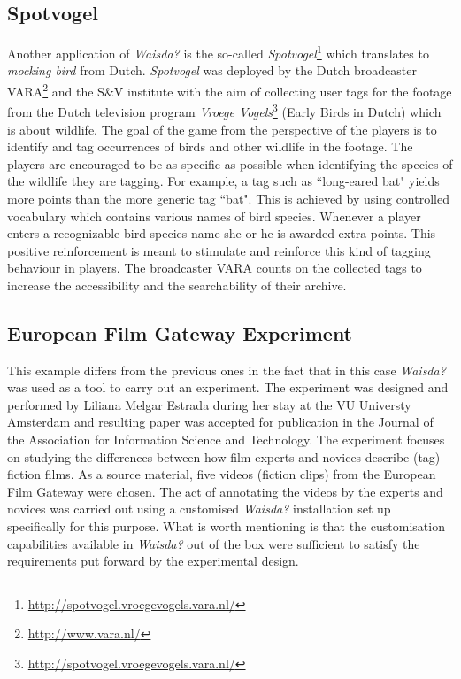 \subsection{Spotvogel}
Another application of \textit{Waisda?} is the so-called \textit{Spotvogel}\footnote{\url{http://spotvogel.vroegevogels.vara.nl/}} which translates to \textit{mocking bird} from Dutch. \textit{Spotvogel} was deployed by the Dutch broadcaster VARA\footnote{\url{http://www.vara.nl/}} and the S\&V institute with the aim of collecting user tags for the footage from the Dutch television program \textit{Vroege Vogels}\footnote{\url{http://spotvogel.vroegevogels.vara.nl/}} (Early Birds in Dutch) which is about wildlife. The goal of the game from the perspective of the players is to identify and tag occurrences of birds and other wildlife in the footage. The players are encouraged to be as specific as possible when identifying the species of the wildlife they are tagging. For example, a tag such as ``long-eared bat" yields more points than the more generic tag ``bat". This is achieved by using controlled vocabulary which contains various names of bird species. Whenever a player enters a recognizable bird species name she or he is awarded extra points. This positive reinforcement is meant to stimulate and reinforce this kind of tagging behaviour in players. The broadcaster VARA counts on the collected tags to increase the accessibility and the searchability of their archive. 

\subsection{European Film Gateway Experiment}
This example differs from the previous ones in the fact that in this case \textit{Waisda?} was used as a tool to carry out an experiment. The experiment was designed and performed by Liliana Melgar Estrada during her stay at the VU Universty Amsterdam and resulting paper \cite{liliana} was accepted for publication in the Journal of the Association for Information Science and Technology. The experiment focuses on studying the differences between how film experts and novices describe (tag) fiction films. As a source material, five videos (fiction clips) from the European Film Gateway were chosen. The act of annotating the videos by the experts and novices was carried out using a customised \textit{Waisda?} installation set up specifically for this purpose. What is worth mentioning is that the customisation capabilities available in \textit{Waisda?} out of the box were sufficient to satisfy the requirements put forward by the experimental design.

